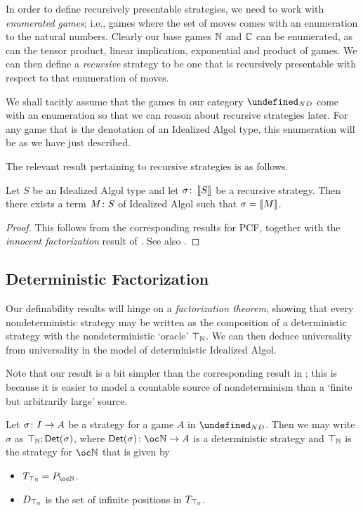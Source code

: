 \documentclass[sigplan,9pt,review]{acmart}\settopmatter{printfolios=true,printccs=false,printacmref=false}
\let\G\undefined
\begin{document}
In order to define recursively presentable strategies, we need to work with \emph{enumerated games}; i.e., games where the set of moves comes with an enumeration to the natural numbers.  
Clearly our base games $\mathbb{N}$ and $\mathbb{C}$ can be enumerated, as can the tensor product, linear implication, exponential and product of games.  
We can then define a \emph{recursive} strategy to be one that is recursively presentable with respect to that enumeration of moves.

We shall tacitly assume that the games in our category $\G_{ND}$ come with an enumeration so that we can reason about recursive strategies later.  
For any game that is the denotation of an Idealized Algol type, this enumeration will be as we have just described.

The relevant result pertaining to recursive strategies is as follows.

\begin{proposition}
  Let $S$ be an Idealized Algol type and let $\sigma\colon \left\llbracket S\right\rrbracket$ be a recursive strategy.  
  Then there exists a term $M\colon S$ of Idealized Algol such that $\sigma=\left\llbracket M\right\rrbracket$.
\end{proposition}
\begin{proof}
  This follows from the corresponding results for PCF, together with the \emph{innocent factorization} result of \cite{SamsonGuyIAPassive}.  
  See also \cite{MurawskiUniversality}.
\end{proof}

\subsection{Deterministic Factorization}

Our definability results will hinge on a \emph{factorization theorem}, showing that every nondeterministic strategy may be written as the composition of a deterministic strategy with the nondeterministic `oracle' $\top_{\mathbb{N}}$.  
We can then deduce universality from universality in the model of deterministic Idealized Algol.

Note that our result is a bit simpler than the corresponding result in \cite{mcCHFiniteND}; this is because it is easier to model a countable source of nondeterminism than a `finite but arbitrarily large' source.

\begin{proposition}
  Let $\sigma\colon I \to A$ be a strategy for a game $A$ in $\G_{ND}$.
  Then we may write $\sigma$ as $\top_{\mathbb{N}};\mathsf{Det}(\sigma)$, where $\Det(\sigma)\from \oc\bN\to A$ is a deterministic strategy and $\top_{\mathbb{N}}$ is the strategy for $\oc\bN$ that is given by
  \begin{itemize}
    \item $T_{\top_{\bN}}=P_{\oc\bN}$.
    \item $D_{\top_{\mathbb{N}}}$ is the set of infinite positions in $T_{\top_{\mathbb{N}}}$.
  \end{itemize}
\end{proposition}
\end{document}
